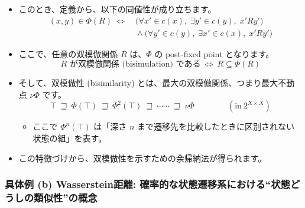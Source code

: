 \documentclass[
		head_space=20mm,
		foot_space=20mm,
		gutter=10mm,
		line_length=190mm
]{jlreq}
\begin{document}
\begin{itemize}
	\item このとき、定義から、以下の同値性が成り立ちます。
	\[\begin{aligned}(x,y)\in\Phi(R) ~\iff~ & \bigl(\forall x'\in c(x),\;\exists y'\in c(y),\;x'Ry'\bigr)\\&{}\land\bigl(\forall y'\in c(y),\;\exists x'\in c(x),\;x'Ry'\bigr)\end{aligned}\]
	\item ここで、任意の双模倣関係 $R$ は、$\Phi$ の post-fixed point となります。
	\[R\textrm{~が双模倣関係 (bisimulation) である} ~\iff~ R\subseteq\Phi(R)\]
	\item そして、双模倣性 (bisimilarity) とは、最大の双模倣関係、つまり最大不動点 $\nu\Phi$ です。
	\[\top~\sqsupseteq~\Phi(\top)~\sqsupseteq~\Phi^2(\top)~\sqsupseteq~\cdots\cdots~\sqsupseteq\;\nu\Phi\qquad\qquad(\textrm{in}~2^{X\times X})\]
	\begin{itemize}
		\item ここで $\Phi^n(\top)$ は「深さ $n$ まで遷移先を比較したときに区別されない状態の組」を表す。
	\end{itemize}
	\item この特徴づけから、双模倣性を示すための余帰納法が得られます。
	\begin{center}
		\begin{prooftree}
			\noLine
		\end{prooftree}
	\end{center}
\end{itemize}



\clearpage

\subsubsection*{具体例 (b) Wasserstein距離: 確率的な状態遷移系における``状態どうしの類似性''の概念}
\end{document}
